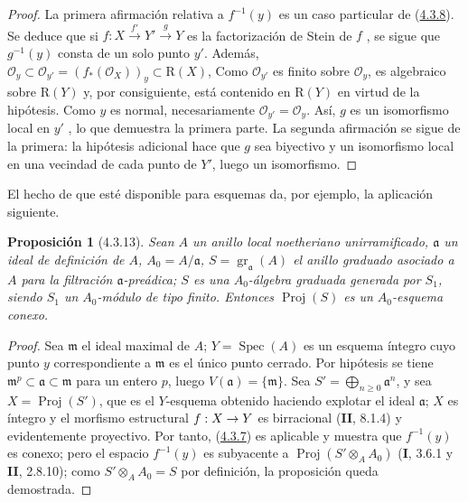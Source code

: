 \documentclass[10pt,oneside,openany]{book}
\theoremstyle{egaenv}\newtheorem*{env}{---}
\theoremstyle{egastatement}
\newtheorem*{proposition}{Proposición}
\theoremstyle{egadescription}
\newcommand{\oldpage}[2][]{\marginnote{\normalfont\scriptsize\textbf{#1}\,|\,#2}\ignorespaces}
\renewcommand{\geq}{\geqslant}
\renewcommand{\to}{\mathchoice{\longrightarrow}{\rightarrow}{\rightarrow}{\rightarrow}}
\begin{document}
\begin{proof}
La primera afirmación relativa a $f^{-1}(y)$ es un caso particular de (\hyperref[III.4.3.8-fr]{4.3.8}). Se
\oldpage[III]{135}
deduce que si $f:X\xrightarrow{f'}Y'\xrightarrow{g}Y$
es la factorización de Stein de $f$ , se sigue que
$g^{-1}(y)$ consta de un solo punto $y'$. Además,
$\mathcal O_y\subset\mathcal O_{y'}=(f_*(\mathcal O_X))_y
\subset\mathrm R(X)$,
Como $\mathcal O_{y'}$ es finito sobre $\mathcal O_y$, es algebraico sobre $\mathrm R(Y)$ y, por consiguiente, está contenido en $\mathrm R(Y)$ en virtud de la hipótesis. Como $y$ es normal, necesariamente
$\mathcal O_{y'}=\mathcal O_y$. Así, $g$ es un isomorfismo local en $y'$
, lo que demuestra la primera parte. La segunda
afirmación se sigue de la primera: la hipótesis adicional hace que $g$
sea biyectivo y un isomorfismo local en una vecindad de cada punto de
$Y'$, luego un isomorfismo.
\end{proof}

El hecho de que  esté disponible para esquemas da, por
ejemplo, la aplicación siguiente.

\begin{proposition}[4.3.13]
\label{III.4.3.13-fr}
Sean $A$ un anillo local noetheriano unirramificado, $\mathfrak a$ un ideal de
definición de $A$, $A_0=A/\mathfrak a$,
$S=\operatorname{gr}_{\mathfrak a}(A)$ el anillo graduado asociado a $A$ para
la filtración $\mathfrak a$-preádica; $S$ es una $A_0$-álgebra graduada
generada por $S_1$, siendo $S_1$ un $A_0$-módulo de tipo finito. Entonces
$\operatorname{Proj}(S)$ es un $A_0$-esquema conexo.
\end{proposition}

\begin{proof}
Sea $\mathfrak m$ el ideal maximal de $A$; $Y=\operatorname{Spec}(A)$ es
un esquema íntegro cuyo punto $y$ correspondiente a $\mathfrak m$ es
el único punto cerrado. Por hipótesis se tiene
$\mathfrak m^p\subset\mathfrak a\subset\mathfrak m$ para un entero $p$,
luego $V(\mathfrak a)=\{\mathfrak m\}$. Sea
$S'=\bigoplus_{n\geq0}\mathfrak a^n$, y sea
$X=\operatorname{Proj}(S')$, que es el $Y$-esquema obtenido haciendo explotar
el ideal $\mathfrak a$; $X$ es íntegro y el morfismo estructural
$f:X\to Y$ es birracional (\textbf{II}, 8.1.4) y evidentemente proyectivo. Por tanto,
(\hyperref[III.4.3.7-fr]{4.3.7}) es aplicable y muestra que $f^{-1}(y)$
es conexo; pero el espacio $f^{-1}(y)$ es subyacente a
$\operatorname{Proj}(S'\otimes_AA_0)$ (\textbf{I}, 3.6.1 y \textbf{II}, 2.8.10); como
$S'\otimes_AA_0=S$ por definición, la proposición queda demostrada.
\end{proof}
\end{document}
